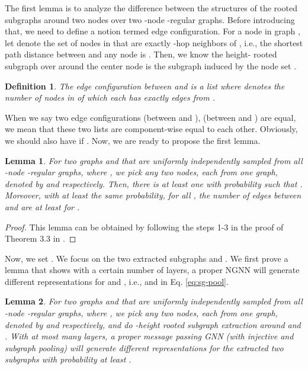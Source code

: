 \documentclass{article}
\newtheorem{definition}{Definition}
\newtheorem{lemma}{Lemma}
\begin{document}
The first lemma is to analyze the difference between the structures of the rooted subgraphs around two nodes over two -node -regular graphs. Before introducing that, we need to define a notion termed edge configuration. For a node  in graph , let  denote the set of nodes in  that are exactly -hop neighbors of , i.e., the shortest path distance between  and any node   is . Then, we know the height- rooted subgraph over  around the center node  is the subgraph induced by the node set . 
\begin{definition}
The edge configuration between  and  is a list  where  denotes the number of nodes in  of which each has exactly  edges from .
\end{definition}
When we say two edge configurations  (between  and ),  (between  and ) are equal, we mean that these two lists are component-wise equal to each other. Obviously, we should also have  if . Now, we are ready to propose the first lemma.
\begin{lemma}\label{lemma:1}
For two graphs  and  that are uniformly independently sampled from all -node -regular graphs, where , we pick any two nodes, each from one graph, denoted by  and  respectively. Then, there is at least one  with probability  such that  . Moreover, with at least the same probability, for all , the number of edges between  and    are at least  for . 
\end{lemma}
\begin{proof}
This lemma can be obtained by following the steps 1-3 in the proof of Theorem 3.3 in \cite{li2020distance}.
\end{proof}


Now, we set . We focus on the two extracted subgraphs  and . We first prove a lemma that shows with a certain number of layers, a proper NGNN will generate different representations for  and , i.e.,  and  in Eq. \ref{eq:sg-pool}.

\begin{lemma}\label{lemma:2}
For two graphs  and  that are uniformly independently sampled from all -node -regular graphs, where , we pick any two nodes, each from one graph, denoted by  and  respectively, and do -height rooted subgraph extraction around  and . With at most  many layers, a proper message passing GNN (with injective  and subgraph pooling) will generate different representations for the extracted two subgraphs with probability at least .
\end{lemma}
\end{document}
